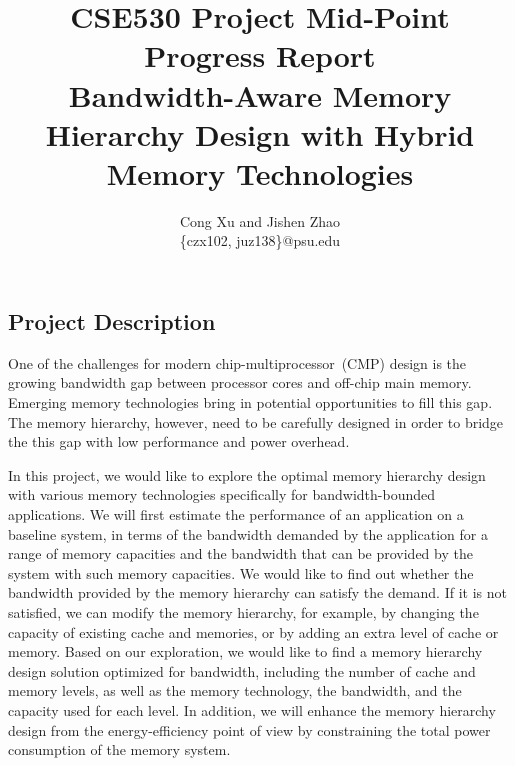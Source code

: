 \documentclass[12pt,letterpaper, singlecolumn]{article}
\begin{document}
\title{CSE530 Project Mid-Point Progress Report\\
Bandwidth-Aware Memory Hierarchy Design with Hybrid Memory Technologies}

\author{Cong Xu and Jishen Zhao\\
\{czx102, juz138\}@psu.edu\vspace{-10pt}
}
\maketitle

\begin{large}


\section{Project Description}

One of the challenges for modern chip-multiprocessor~(CMP) design is the growing bandwidth gap
between processor cores and off-chip main memory. Emerging memory technologies
bring in potential opportunities to fill this gap. The memory hierarchy,
however, need to be carefully designed in order to bridge the this gap with low
performance and power overhead.

In this project, we would like to explore the optimal memory hierarchy design
with various memory technologies specifically for bandwidth-bounded
applications. We will first estimate the performance of an application on a
baseline system, in terms of the bandwidth demanded by the application for a
range of memory capacities and the bandwidth that can be provided by the system
with such memory capacities. We would like to find out whether the bandwidth
provided by the memory hierarchy can satisfy the demand. If it is not satisfied,
we can modify the memory hierarchy, for example, by changing the capacity of
existing cache and memories, or by adding an extra level of cache or memory.
Based on our exploration, we would like to find a memory hierarchy design
solution optimized for bandwidth, including the number of cache and memory
levels, as well as the memory technology, the bandwidth, and the capacity used
for each level. In addition, we will enhance the memory hierarchy design from
the energy-efficiency point of view by constraining the total power consumption
of the memory system.\vspace{0.15in}


\end{large}
\end{document}
